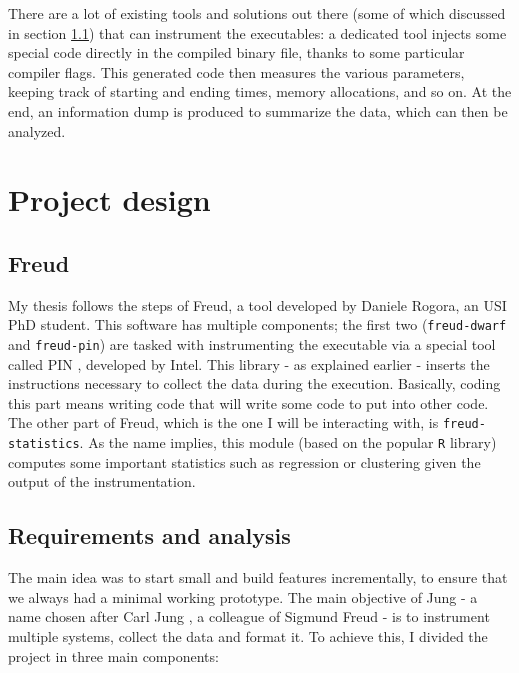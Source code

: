     There are a lot of existing tools and solutions out there (some of which discussed in section \ref{sec:freud})
    that can instrument the executables: a dedicated tool injects some special code directly in the compiled
    binary file, thanks to some particular compiler flags. This generated code then measures
    the various parameters, keeping track of starting and ending times, memory allocations, and so on.
    At the end, an information dump is produced to summarize the data, which can then be analyzed.


\chapter{Project design}

    \section{Freud}\label{sec:freud}


        My thesis follows the steps of Freud, a tool developed by Daniele Rogora, an USI PhD student.
        This software has multiple components; the first two (\texttt{freud-dwarf} and \texttt{freud-pin})
        are tasked with instrumenting the executable 
        via a special tool called PIN \cite{pin}, developed by Intel. This library - as explained earlier - 
        inserts the instructions necessary to collect the data during the execution. Basically, coding this
        part means writing code that will write some code to put into other code.\\

        The other part of Freud, which is the one I will be interacting with, is \texttt{freud-statistics}.
        As the name implies, this module (based on the popular \texttt{R} library) computes some important
        statistics such as regression or clustering given the output of the instrumentation.


    \section{Requirements and analysis}


        The main idea was to start small and build features incrementally, to ensure that we always
        had a minimal working prototype. The main objective of Jung - a name chosen after Carl Jung \cite{jung},
        a colleague of Sigmund Freud - is to instrument multiple systems, collect the data and format it.
        To achieve this, I divided the project in three main components:

